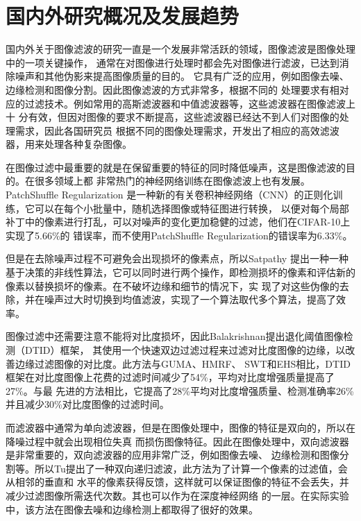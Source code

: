 %
%
%
%

\section{国内外研究概况及发展趋势}
国内外关于图像滤波的研究一直是一个发展非常活跃的领域，图像滤波是图像处理中的一项关键操作，
通常在对图像进行处理时都会先对图像进行滤波，已达到消除噪声和其他伪影来提高图像质量的目的。
它具有广泛的应用，例如图像去噪、边缘检测和图像分割。因此图像滤波的方式非常多，根据不同的
处理要求有相对应的过滤技术。例如常用的高斯滤波器和中值滤波器等，这些滤波器在图像滤波上十
分有效，但因对图像的要求不断提高，这些滤波器已经达不到人们对图像的处理需求，因此各国研究员
根据不同的图像处理需求，开发出了相应的高效滤波器，用来处理各种复杂图像。

在图像过滤中最重要的就是在保留重要的特征的同时降低噪声，这是图像滤波的目的。在很多领域上都
非常热门的神经网络训练在图像滤波上也有发展。PatchShuffle Regularization\cite{kangPatchShuffleRegularization2017}
是一种新的有关卷积神经网络（CNN）的正则化训练，它可以在每个小批量中，随机选择图像或特征图进行转换，
以便对每个局部补丁中的像素进行打乱，可以对噪声的变化更加稳健的过滤，他们在CIFAR-10上实现了5.66\%的
错误率，而不使用PatchShuffle Regularization的错误率为6.33\%。

但是在去除噪声过程不可避免会出现损坏的像素点，所以Satpathy\cite{satpathyAdaptiveNonlinearFiltering2022}
提出一种一种基于决策的非线性算法，它可以同时进行两个操作，即检测损坏的像素和评估新的像素以替换损坏的像素。在不破坏边缘和细节的情况下，实
现了对这些伪像的去除，并在噪声过大时切换到均值滤波，实现了一个算法取代多个算法，提高了效率。

图像过滤中还需要注意不能将对比度损坏，因此Balakrishnan\cite{natarajanContrastEnhancementBased2022}提出退化阈值图像检测（DTID）框架，
其使用一个快速双边过滤过程来过滤对比度图像的边缘，以改善边缘过滤图像的对比度。此方法与GUMA、HMRF、
SWT和EHS相比，DTID框架在对比度图像上花费的过滤时间减少了54\%，平均对比度增强质量提高了27\%。与最
先进的方法相比，它提高了28\%平均对比度增强质量、检测准确率26\%并且减少30\%对比度图像的过滤时间。

而滤波器中通常为单向滤波器，但是在图像处理中，图像的特征是双向的，所以在降噪过程中就会出现相位失真
而损伤图像特征。因此在图像处理中，双向滤波器是非常重要的，双向滤波器的应用非常广泛，例如图像去噪、
边缘检测和图像分割等。所以Tu\cite{tuTwoWayRecursiveFiltering2021}提出了一种双向递归滤波，此方法为了计算一个像素的过滤值，会从相邻的垂直和
水平的像素获得反馈，这样就可以保证图像的特征不会丢失，并减少过滤图像所需迭代次数。其也可以作为在深度神经网络
的一层。在实际实验中，该方法在图像去噪和边缘检测上都取得了很好的效果。

